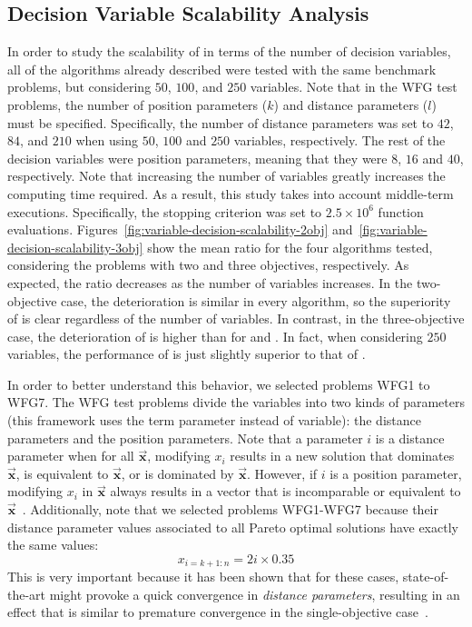 \subsection{Decision Variable Scalability Analysis}

In order to study the scalability of \VSDMOEA{} in terms of the number of decision variables, all of the algorithms already described were tested with
the same benchmark problems, but considering $50$, $100$, and $250$ variables.
%
Note that in the WFG test problems, the number of position parameters ($k$) and distance parameters ($l$) must be specified.
%
Specifically, the number of distance parameters was set to $42$, $84$, and $210$ when using $50$, $100$ and $250$ variables, respectively.
%
The rest of the decision variables were position parameters, meaning that they were $8$, $16$ and $40$, respectively.
%
Note that increasing the number of variables greatly increases the computing time required.
%
As a result, this study takes into account middle-term executions.
%
Specifically, the stopping criterion was set to $2.5 \times 10^6$ function evaluations.
%
Figures~\ref{fig:variable-decision-scalability-2obj} and~\ref{fig:variable-decision-scalability-3obj} 
show the mean \HV{} ratio for the four algorithms tested,
considering the problems with two and three objectives, respectively.
%
As expected, the \HV{} ratio decreases as the number of variables increases.
%
In the two-objective case, the deterioration is similar in every algorithm, so the superiority of \VSDMOEA{} is clear regardless of the number of 
variables.
%
In contrast, in the three-objective case, the deterioration of \VSDMOEA{} is higher than for \RMOEA{} and \MOEAD{}.
%
In fact, when considering $250$ variables, the performance of \VSDMOEA{} is just slightly superior to that of \RMOEA{}.


In order to better understand this behavior, we selected problems WFG1 to WFG7.
%
The WFG test problems divide the variables into two kinds of parameters (this framework uses the term parameter instead of 
variable): the distance parameters and the position parameters.
%
Note that a parameter $i$ is a distance parameter when for all $\vec{\mathbf{x}}$, modifying $x_i$ results in a new solution 
that dominates $\vec{\mathbf{x}}$, is equivalent to $\vec{\mathbf{x}}$, or is dominated by $\vec{\mathbf{x}}$.
%
However, if $i$ is a position parameter, modifying $x_i$ in $\vec{\mathbf{x}}$ always results in a vector that is incomparable or 
equivalent to $\vec{\mathbf{x}}$~\cite{huband2005scalable}.
%
Additionally, note that we selected problems WFG1-WFG7 because their distance parameter values associated to all Pareto optimal solutions 
have exactly the same values:
%
\begin{equation}
   x_{i=k+1:n} = 2i \times 0.35
\end{equation}
%
This is very important because it has been shown that for these cases, state-of-the-art
\MOEAS{} might provoke a quick convergence in \textit{distance parameters}, resulting in an effect that is similar to premature convergence
in the single-objective case~\cite{Joel:GDE3_CEC09}.

